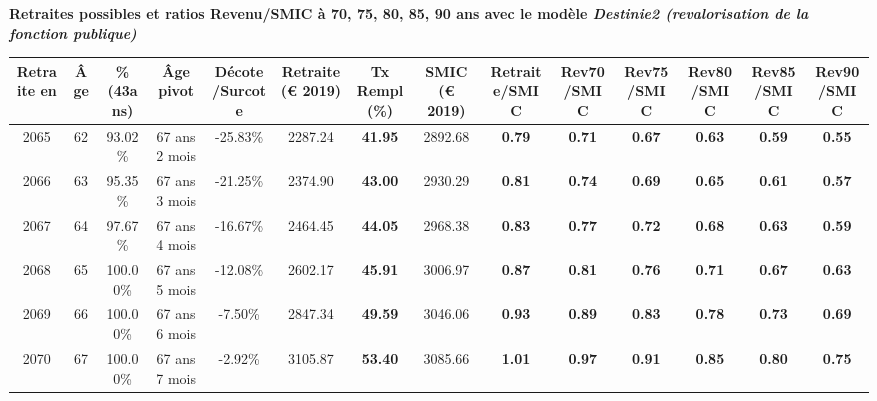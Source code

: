  \vspace{0.1cm} 
{\bf \noindent Retraites possibles et ratios Revenu/SMIC à 70, 75, 80, 85, 90 ans avec le modèle \emph{Destinie2 (revalorisation de la fonction publique)}}  
 
\begin{adjustbox}{max width=\textwidth} 
\begin{tabular}[htb]{|c|c||c|c|c||c|c||c||c|c|c|c|c|c|} 
\hline 
 Retraite en &  Âge &  \%(43ans) &  Âge pivot &  Décote/Surcote &  Retraite (\euro{} 2019) &  Tx Rempl(\%) &  SMIC (\euro{} 2019) &  Retraite/SMIC &  Rev70/SMIC &  Rev75/SMIC &  Rev80/SMIC &  Rev85/SMIC &  Rev90/SMIC \\ 
\hline \hline 
 2065 &  62 &  93.02\% &  67 ans 2 mois &  -25.83\% &  2287.24 &  {\bf 41.95} &  2892.68 &  {\bf {\color{red} 0.79}} &  {\bf {\color{red} 0.71}} &  {\bf {\color{red} 0.67}} &  {\bf {\color{red} 0.63}} &  {\bf {\color{red} 0.59}} &  {\bf {\color{red} 0.55}} \\ 
\hline 
 2066 &  63 &  95.35\% &  67 ans 3 mois &  -21.25\% &  2374.90 &  {\bf 43.00} &  2930.29 &  {\bf {\color{red} 0.81}} &  {\bf {\color{red} 0.74}} &  {\bf {\color{red} 0.69}} &  {\bf {\color{red} 0.65}} &  {\bf {\color{red} 0.61}} &  {\bf {\color{red} 0.57}} \\ 
\hline 
 2067 &  64 &  97.67\% &  67 ans 4 mois &  -16.67\% &  2464.45 &  {\bf 44.05} &  2968.38 &  {\bf {\color{red} 0.83}} &  {\bf {\color{red} 0.77}} &  {\bf {\color{red} 0.72}} &  {\bf {\color{red} 0.68}} &  {\bf {\color{red} 0.63}} &  {\bf {\color{red} 0.59}} \\ 
\hline 
 2068 &  65 &  100.00\% &  67 ans 5 mois &  -12.08\% &  2602.17 &  {\bf 45.91} &  3006.97 &  {\bf {\color{red} 0.87}} &  {\bf {\color{red} 0.81}} &  {\bf {\color{red} 0.76}} &  {\bf {\color{red} 0.71}} &  {\bf {\color{red} 0.67}} &  {\bf {\color{red} 0.63}} \\ 
\hline 
 2069 &  66 &  100.00\% &  67 ans 6 mois &  -7.50\% &  2847.34 &  {\bf 49.59} &  3046.06 &  {\bf {\color{red} 0.93}} &  {\bf {\color{red} 0.89}} &  {\bf {\color{red} 0.83}} &  {\bf {\color{red} 0.78}} &  {\bf {\color{red} 0.73}} &  {\bf {\color{red} 0.69}} \\ 
\hline 
 2070 &  67 &  100.00\% &  67 ans 7 mois &  -2.92\% &  3105.87 &  {\bf 53.40} &  3085.66 &  {\bf 1.01} &  {\bf {\color{red} 0.97}} &  {\bf {\color{red} 0.91}} &  {\bf {\color{red} 0.85}} &  {\bf {\color{red} 0.80}} &  {\bf {\color{red} 0.75}} \\ 
\hline 
\hline 
\end{tabular} 
\end{adjustbox} 
 
